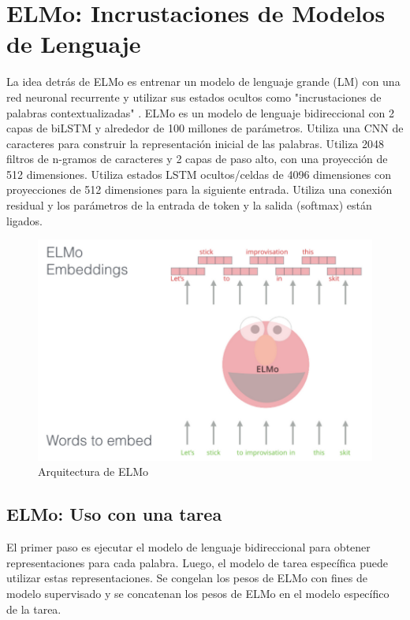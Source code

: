 \section{ELMo: Incrustaciones de Modelos de Lenguaje}

La idea detrás de ELMo es entrenar un modelo de lenguaje grande (LM) con una red neuronal recurrente y utilizar sus estados ocultos como "incrustaciones de palabras contextualizadas" \cite{peters-etal-2018-deep}. ELMo es un modelo de lenguaje bidireccional con 2 capas de biLSTM y alrededor de 100 millones de parámetros. Utiliza una CNN de caracteres para construir la representación inicial de las palabras. Utiliza 2048 filtros de n-gramos de caracteres y 2 capas de paso alto, con una proyección de 512 dimensiones. Utiliza estados LSTM ocultos/celdas de 4096 dimensiones con proyecciones de 512 dimensiones para la siguiente entrada. Utiliza una conexión residual y los parámetros de la entrada de token y la salida (softmax) están ligados.

\begin{figure}[h]
  \centering
  \includegraphics[scale=0.29]{pics/elmo.png}
  \caption{Arquitectura de ELMo}
\end{figure}

\subsection{ELMo: Uso con una tarea}

El primer paso es ejecutar el modelo de lenguaje bidireccional para obtener representaciones para cada palabra. Luego, el modelo de tarea específica puede utilizar estas representaciones. Se congelan los pesos de ELMo con fines de modelo supervisado y se concatenan los pesos de ELMo en el modelo específico de la tarea.


